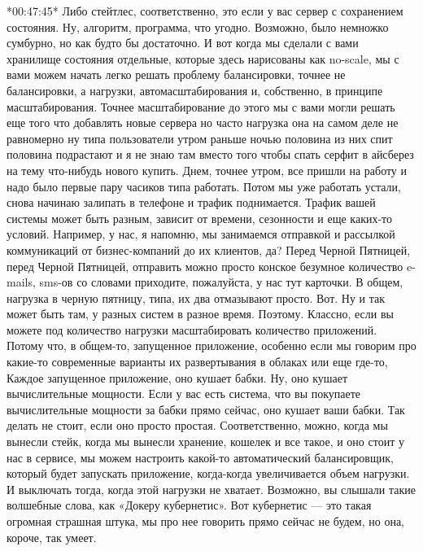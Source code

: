 \documentclass[12pt]{article} %
\begin{document}
*00:47:45*
Либо стейтлес, соответственно, это если у вас сервер  с сохранением состояния.  Ну, алгоритм, программа, что угодно.  Возможно, было немножко сумбурно, но как будто бы достаточно.  И вот когда мы сделали с вами хранилище состояния отдельные, которые здесь нарисованы как no-scale, мы с вами можем начать легко решать проблему балансировки, точнее не балансировки, а нагрузки, автомасштабирования и, собственно, в принципе масштабирования.  Точнее масштабирование до этого мы с вами могли решать еще того что добавлять новые сервера но часто нагрузка она на самом деле не равномерно ну типа пользователи утром раньше ночью половина из них спит половина подрастают и я не знаю там вместо того чтобы спать серфит в айсберез на тему что-нибудь нового купить.  Днем, точнее утром, все пришли на работу и надо было первые пару часиков типа работать.  Потом мы уже работать устали, снова начинаю залипать в телефоне и трафик поднимается.  Трафик вашей системы может быть разным, зависит от времени, сезонности и еще каких-то условий.  Например, у нас, я напомню, мы занимаемся отправкой и рассылкой коммуникаций от бизнес-компаний до их клиентов, да?  Перед Черной Пятницей, перед Черной Пятницей, отправить можно просто конское безумное количество e-mails, sms-ов со словами приходите, пожалуйста, у нас тут карточки.  В общем, нагрузка в черную пятницу, типа, их два отмазывают просто.  Вот.  Ну и так может быть там, у разных систем в разное время.  Поэтому.  Классно, если вы можете под количество нагрузки масштабировать количество приложений.  Потому что, в общем-то, запущенное приложение, особенно если мы говорим про какие-то современные варианты их развертывания в облаках или еще где-то, Каждое запущенное приложение, оно кушает бабки.  Ну, оно кушает вычислительные мощности.  Если у вас есть система, что вы покупаете вычислительные мощности за бабки прямо сейчас, оно кушает ваши бабки.  Так делать не стоит, если оно просто простая.  Соответственно, можно, когда мы вынесли стейк, когда мы вынесли хранение, кошелек и все такое, и оно стоит у нас в сервисе, мы можем настроить какой-то автоматический балансировщик, который будет запускать приложение, когда-когда увеличивается объем нагрузки.  И выключать тогда, когда этой нагрузки не хватает.  Возможно, вы слышали такие волшебные слова, как «Докеру кубернетис».  Вот кубернетис — это такая огромная страшная штука, мы про нее говорить прямо сейчас не будем, но она, короче, так умеет.
\end{document}

